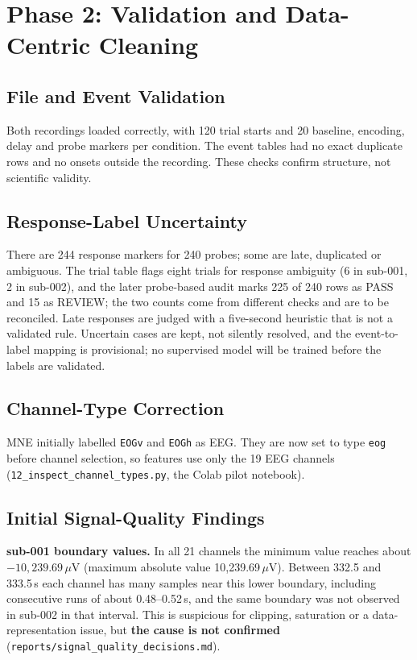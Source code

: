 \documentclass[11pt,a4paper]{article}
\begin{document}
\section{Phase 2: Validation and Data-Centric Cleaning}
\label{sec:quality}

\subsection{File and Event Validation}
Both recordings loaded correctly, with 120 trial starts and 20 baseline, encoding, delay and probe markers per
condition. The event tables had no exact duplicate rows and no onsets outside the recording. These checks confirm
structure, not scientific validity.

\subsection{Response-Label Uncertainty}
There are 244 response markers for 240 probes; some are late, duplicated or ambiguous. The trial table flags eight trials
for response ambiguity (6 in sub-001, 2 in sub-002), and the later probe-based audit marks 225 of 240 rows as PASS and 15
as REVIEW; the two counts come from different checks and are to be reconciled. Late responses are judged with a five-second heuristic that is not a
validated rule. Uncertain cases are kept, not silently resolved, and the event-to-label mapping is provisional; no
supervised model will be trained before the labels are validated.

\subsection{Channel-Type Correction}
MNE initially labelled \texttt{EOGv} and \texttt{EOGh} as EEG. They are now set to type \texttt{eog} before channel selection,
so features use only the 19 EEG channels (\texttt{12\_inspect\_channel\_types.py}, the Colab pilot notebook).

\subsection{Initial Signal-Quality Findings}
\textbf{sub-001 boundary values.} In all 21 channels the minimum value reaches about $-10{,}239.69\,\mu$V (maximum
absolute value 10{,}239.69\,$\mu$V). Between 332.5 and 333.5\,s each channel has many samples near this lower boundary,
including consecutive runs of about 0.48--0.52\,s, and the same boundary was not observed in sub-002 in that interval.
This is suspicious for clipping, saturation or a data-representation issue, but \textbf{the cause is not confirmed}
(\texttt{reports/signal\_quality\_decisions.md}).
\end{document}
